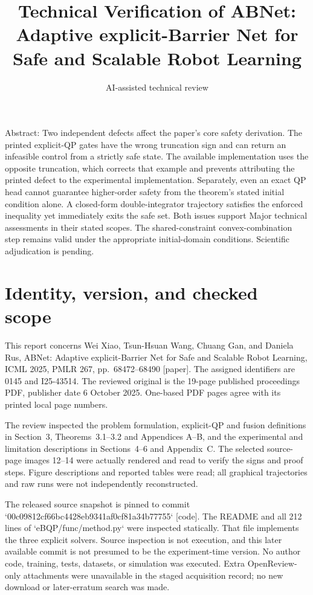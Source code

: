 \documentclass[10pt]{article}
\title{Technical Verification of
ABNet: Adaptive explicit-Barrier Net for Safe and Scalable Robot Learning}
\author{AI-assisted technical review}
\date{}
\begin{document}
\maketitle
Abstract: Two independent defects affect the paper’s core safety derivation. The printed explicit-QP gates have the wrong truncation sign and can return an infeasible control from a strictly safe state. The available implementation uses the opposite truncation, which corrects that example and prevents attributing the printed defect to the experimental implementation. Separately, even an exact QP head cannot guarantee higher-order safety from the theorem’s stated initial condition alone. A closed-form double-integrator trajectory satisfies the enforced inequality yet immediately exits the safe set. Both issues support Major technical assessments in their stated scopes. The shared-constraint convex-combination step remains valid under the appropriate initial-domain conditions. Scientific adjudication is pending.\par
\section*{Identity, version, and checked scope}
This report concerns Wei Xiao, Tsun-Hsuan Wang, Chuang Gan, and Daniela Rus, ABNet: Adaptive explicit-Barrier Net for Safe and Scalable Robot Learning, ICML 2025, PMLR 267, pp. 68472–68490 [paper]. The assigned identifiers are 0145 and I25-43514. The reviewed original is the 19-page published proceedings PDF, publisher date 6 October 2025. One-based PDF pages agree with its printed local page numbers.\par
The review inspected the problem formulation, explicit-QP and fusion definitions in Section 3, Theorems 3.1–3.2 and Appendices A–B, and the experimental and limitation descriptions in Sections 4–6 and Appendix C. The selected source-page images 12–14 were actually rendered and read to verify the signs and proof steps. Figure descriptions and reported tables were read; all graphical trajectories and raw runs were not independently reconstructed.\par
The released source snapshot is pinned to commit `00c09812cf66bc4428eb9341af0cf81a34b77755` [code]. The README and all 212 lines of `eBQP/func/method.py` were inspected statically. That file implements the three explicit solvers. Source inspection is not execution, and this later available commit is not presumed to be the experiment-time version. No author code, training, tests, datasets, or simulation was executed. Extra OpenReview-only attachments were unavailable in the staged acquisition record; no new download or later-erratum search was made.\par
\end{document}

